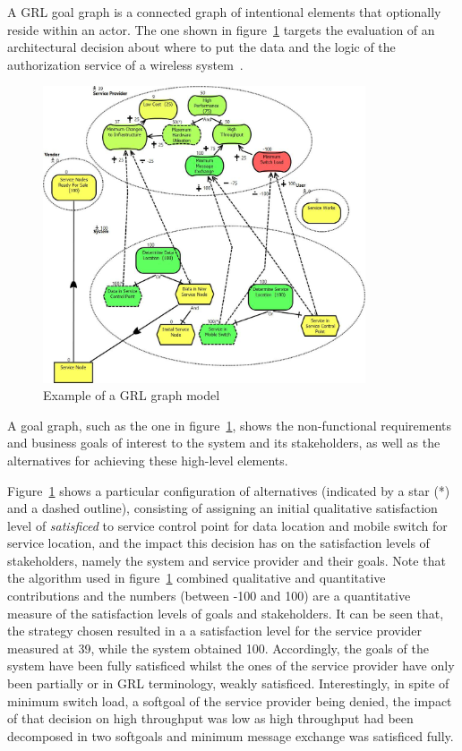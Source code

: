 \documentclass[dissertation,final]{softeng}
\begin{document}
{A GRL goal graph is a connected graph of intentional elements that optionally reside within an actor. The one shown in figure~\ref{fig:WirelessIN_Integrated_GRLGraph} targets the evaluation of an architectural decision about where to put the data and the logic of the authorization service of a wireless system~\citep{amyot2011user}.

\begin{figure}[h]
\includegraphics[width=0.85\textwidth]{WirelessIN-Integrated-GRLGraph}
\centering
\caption[Example of a GRL graph model]{Example of a GRL graph model~\citep{amyot2011user}}
\label{fig:WirelessIN_Integrated_GRLGraph}
\end{figure}

A goal graph, such as the one in figure~\ref{fig:WirelessIN_Integrated_GRLGraph}, shows the non-functional requirements and business goals of interest to the system and its stakeholders, as well as the alternatives for achieving these high-level elements. 

Figure~\ref{fig:WirelessIN_Integrated_GRLGraph} shows a particular configuration of alternatives (indicated by a star (*) and a dashed outline), consisting of assigning an initial qualitative satisfaction level of \emph{satisficed} to service control point for data location and mobile switch for service location, and the impact this decision has on the satisfaction levels of stakeholders, namely the system and service provider and their goals. Note that the algorithm used in figure~\ref{fig:WirelessIN_Integrated_GRLGraph} combined qualitative and quantitative contributions and the numbers (between -100 and 100) are a quantitative measure of the satisfaction levels of goals and stakeholders. It can be seen that, the strategy chosen resulted in a a satisfaction level for the service provider measured at 39, while the system obtained 100. Accordingly, the goals of the system have been fully satisficed whilst the ones of the service provider have only been partially or in GRL terminology, weakly satisficed. Interestingly, in spite of minimum switch load, a softgoal of the service provider being denied, the impact of that decision on high throughput was low as high throughput had been decomposed in two softgoals and minimum message exchange was satisficed fully. 

}
\end{document}
